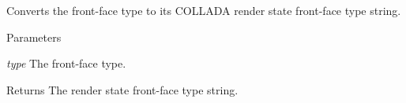 \label{namespaceFUDaePassStateFrontFaceType_a565d7064373942fbbbbd3ead31a5104e}
Converts the front-\/face type to its COLLADA render state front-\/face type string. 
\begin{DoxyParams}{Parameters}
\item[{\em type}]The front-\/face type. \end{DoxyParams}
\begin{DoxyReturn}{Returns}
The render state front-\/face type string. 
\end{DoxyReturn}
